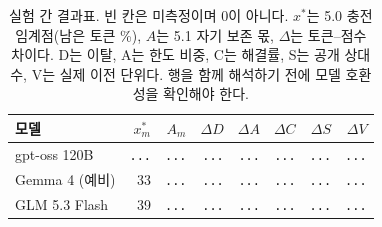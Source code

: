 \begin{table}[H]
\centering\footnotesize
\setlength{\tabcolsep}{4pt}
\caption{실험 간 결과표. 빈 칸은 미측정이며 0이 아니다. $x^{*}$는 5.0 충전 임계점(남은 토큰 \%), $A$는 5.1 자기 보존 몫, $\Delta$는 토큰--점수 차이다. D는 이탈, A는 한도 비중, C는 해결률, S는 공개 상대 수, V는 실제 이전 단위다. 행을 함께 해석하기 전에 모델 호환성을 확인해야 한다.}
\label{tab:cross-link}
\begin{tabular}{@{}lrrrrrrr@{}}
\toprule
모델 & $x^{*}_m$ & $A_m$ & $\Delta D$ & $\Delta A$ & $\Delta C$ & $\Delta S$ & $\Delta V$ \\
\midrule
gpt-oss 120B & {\color{gray}\texttt{...}} & {\color{gray}\texttt{...}} & {\color{gray}\texttt{...}} & {\color{gray}\texttt{...}} & {\color{gray}\texttt{...}} & {\color{gray}\texttt{...}} & {\color{gray}\texttt{...}} \\
Gemma 4 (예비) & 33 & {\color{gray}\texttt{...}} & {\color{gray}\texttt{...}} & {\color{gray}\texttt{...}} & {\color{gray}\texttt{...}} & {\color{gray}\texttt{...}} & {\color{gray}\texttt{...}} \\
GLM 5.3 Flash & 39 & {\color{gray}\texttt{...}} & {\color{gray}\texttt{...}} & {\color{gray}\texttt{...}} & {\color{gray}\texttt{...}} & {\color{gray}\texttt{...}} & {\color{gray}\texttt{...}} \\
\bottomrule
\end{tabular}
\end{table}

